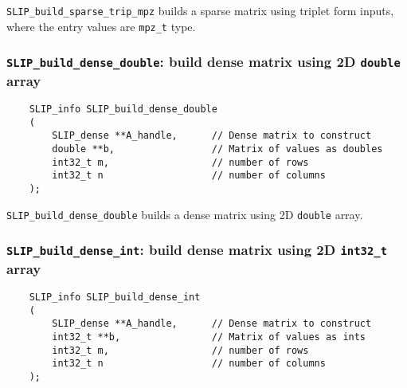 \documentclass[12pt]{article}
\theoremstyle{definition}
\begin{document}
\verb|SLIP_build_sparse_trip_mpz| builds a sparse matrix using triplet form
inputs, where the entry values are \verb|mpz_t| type.

\cprotect\subsubsection{\verb|SLIP_build_dense_double|: build dense matrix using 2D \verb|double| array}
\label{s:user:build_dense_double}


\begin{mdframed}[userdefinedwidth=6in]
{\footnotesize
\begin{verbatim}
    SLIP_info SLIP_build_dense_double
    (
        SLIP_dense **A_handle,      // Dense matrix to construct
        double **b,                 // Matrix of values as doubles
        int32_t m,                  // number of rows
        int32_t n                   // number of columns
    );
\end{verbatim}
} \end{mdframed}

\verb|SLIP_build_dense_double| builds a dense matrix using 2D \verb|double|
array.

\cprotect\subsubsection{\verb|SLIP_build_dense_int|: build dense matrix using 2D \verb|int32_t| array}
\label{s:user:build_dense_int}

\begin{mdframed}[userdefinedwidth=6in]
{\footnotesize
\begin{verbatim}
    SLIP_info SLIP_build_dense_int
    (
        SLIP_dense **A_handle,      // Dense matrix to construct
        int32_t **b,                // Matrix of values as ints
        int32_t m,                  // number of rows
        int32_t n                   // number of columns
    );
\end{verbatim}
} \end{mdframed}
\end{document}
